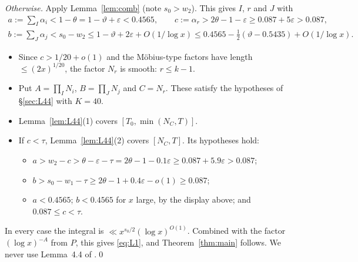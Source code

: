 \documentclass[11pt]{amsart}
\theoremstyle{definition}
\theoremstyle{remark}
\newcommand{\e}{\varepsilon}
\begin{document}
\emph{Otherwise.} Apply Lemma~\ref{lem:comb} (note $s_0>w_2$). This gives $I$, $r$ and $J$ with
\begin{gather*}
a:=\textstyle\sum_I\alpha_i<1-\theta=1-\vartheta+\e<0.4565,\qquad c:=\alpha_r>2\theta-1-\e\ge0.087+5\e>0.087,\\
b:=\textstyle\sum_J\alpha_j<s_0-w_2\le1-\vartheta+2\e+O(1/\log x)\le0.4565-\tfrac12(\vartheta-0.5435)+O(1/\log x).
\end{gather*}
\begin{itemize}[leftmargin=*]
\item Since $c>1/20+o(1)$ and the M\"obius-type factors have length $\le(2x)^{1/20}$, the factor $N_r$ is smooth: $r\le k-1$.
\item Put $A=\prod_IN_i$, $B=\prod_JN_j$ and $C=N_r$. These satisfy the hypotheses of \S\ref{sec:L44} with $K=40$.
\item Lemma~\ref{lem:L44}(1) covers $[T_0,\min(N_C,T)]$.
\item If $c<\tau$, Lemma~\ref{lem:L44}(2) covers $[N_C,T]$. Its hypotheses hold:
\begin{itemize}[leftmargin=*]
\item $a>w_2-c>\theta-\e-\tau=2\theta-1-0.1\e\ge0.087+5.9\e>0.087$;
\item $b>s_0-w_1-\tau\ge2\theta-1+0.4\e-o(1)\ge0.087$;
\item $a<0.4565$; $b<0.4565$ for $x$ large, by the display above; and $0.087\le c<\tau$.
\end{itemize}
\end{itemize}
In every case the integral is $\ll x^{s_0/2}(\log x)^{O(1)}$. Combined with the factor $(\log x)^{-A}$ from $P$, this gives \eqref{eq:L1}, and
Theorem~\ref{thm:main} follows. We never use Lemma~4.4 of \cite{MT}.\qed
\end{document}
